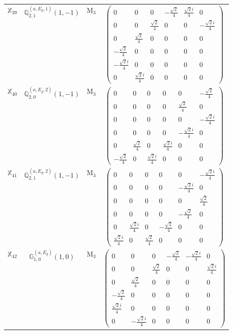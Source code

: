 \documentclass[fleqn,10pt,landscape]{article}
\begin{document}
\begin{itemize}
\begin{center}
\begin{longtable}{c|c|c|c}
$ \mathbb{X}_{39} $ & $\mathbb{Q}_{2,1}^{(a,E_{g},1)}(1,-1)$ & M$_{3}$ & $\begin{pmatrix} 0 & 0 & 0 & - \frac{\sqrt{2}}{4} & \frac{\sqrt{2} i}{4} & 0 \\ 0 & 0 & \frac{\sqrt{2}}{4} & 0 & 0 & - \frac{\sqrt{2} i}{4} \\ 0 & \frac{\sqrt{2}}{4} & 0 & 0 & 0 & 0 \\ - \frac{\sqrt{2}}{4} & 0 & 0 & 0 & 0 & 0 \\ - \frac{\sqrt{2} i}{4} & 0 & 0 & 0 & 0 & 0 \\ 0 & \frac{\sqrt{2} i}{4} & 0 & 0 & 0 & 0 \end{pmatrix}$ \\
$ \mathbb{X}_{40} $ & $\mathbb{Q}_{2,0}^{(a,E_{g},2)}(1,-1)$ & M$_{3}$ & $\begin{pmatrix} 0 & 0 & 0 & 0 & 0 & - \frac{\sqrt{2}}{4} \\ 0 & 0 & 0 & 0 & \frac{\sqrt{2}}{4} & 0 \\ 0 & 0 & 0 & 0 & 0 & - \frac{\sqrt{2} i}{4} \\ 0 & 0 & 0 & 0 & - \frac{\sqrt{2} i}{4} & 0 \\ 0 & \frac{\sqrt{2}}{4} & 0 & \frac{\sqrt{2} i}{4} & 0 & 0 \\ - \frac{\sqrt{2}}{4} & 0 & \frac{\sqrt{2} i}{4} & 0 & 0 & 0 \end{pmatrix}$ \\
$ \mathbb{X}_{41} $ & $\mathbb{Q}_{2,1}^{(a,E_{g},2)}(1,-1)$ & M$_{3}$ & $\begin{pmatrix} 0 & 0 & 0 & 0 & 0 & - \frac{\sqrt{2} i}{4} \\ 0 & 0 & 0 & 0 & - \frac{\sqrt{2} i}{4} & 0 \\ 0 & 0 & 0 & 0 & 0 & \frac{\sqrt{2}}{4} \\ 0 & 0 & 0 & 0 & - \frac{\sqrt{2}}{4} & 0 \\ 0 & \frac{\sqrt{2} i}{4} & 0 & - \frac{\sqrt{2}}{4} & 0 & 0 \\ \frac{\sqrt{2} i}{4} & 0 & \frac{\sqrt{2}}{4} & 0 & 0 & 0 \end{pmatrix}$ \\
$ \mathbb{X}_{42} $ & $\mathbb{G}_{1,0}^{(a,E_{g})}(1,0)$ & M$_{3}$ & $\begin{pmatrix} 0 & 0 & 0 & - \frac{\sqrt{2}}{4} & - \frac{\sqrt{2} i}{4} & 0 \\ 0 & 0 & \frac{\sqrt{2}}{4} & 0 & 0 & \frac{\sqrt{2} i}{4} \\ 0 & \frac{\sqrt{2}}{4} & 0 & 0 & 0 & 0 \\ - \frac{\sqrt{2}}{4} & 0 & 0 & 0 & 0 & 0 \\ \frac{\sqrt{2} i}{4} & 0 & 0 & 0 & 0 & 0 \\ 0 & - \frac{\sqrt{2} i}{4} & 0 & 0 & 0 & 0 \end{pmatrix}$ \\

\end{longtable}
\end{center}
\end{itemize}
\end{document}
